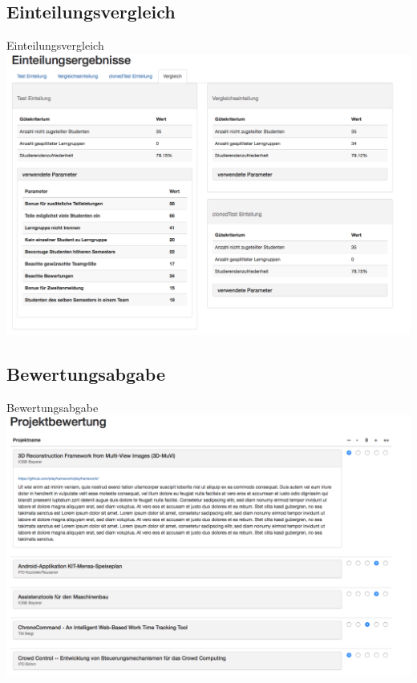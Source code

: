 \documentclass[18pt, xcolor=table]{beamer}
\begin{document}
\subsection{Einteilungsvergleich}
\begin{frame}{Einteilungsvergleich}
\includegraphics[width=\linewidth]{bilder/comparison.png}
\end{frame}

\subsection{Bewertungsabgabe}
\begin{frame}{Bewertungsabgabe}
\includegraphics[width=\linewidth]{bilder/rating.png}
\end{frame}
\end{document}
